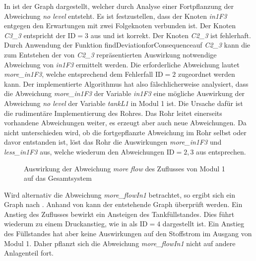 In  ist der Graph dargestellt, welcher durch Analyse einer Fortpflanzung der Abweichung \textit{no level} entsteht. Es ist festzustellen, dass der Knoten \textit{in1F3} entgegen den Erwartungen mit zwei Folgeknoten verbunden ist. Der Knoten \textit{C3\_3} entspricht der $\text{ID} = 3$ aus  und ist korrekt. Der Knoten \textit{C2\_3} ist fehlerhaft. Durch Anwendung der Funktion \glqq findDeviationforConsequence\grqq { }auf \textit{C2\_3} kann die zum Entstehen der von \textit{C2\_3} repr\"asentierten Auswirkung notwendige Abweichung von \textit{in1F3} ermittelt werden. Die erforderliche Abweichung lautet \textit{more{\_}in1F3}, welche entsprechend  dem Fehlerfall $\text{ID} = 2$ zugeordnet werden kann. Der implementierte Algorithmus hat also f\"alschlicherweise analysiert, dass die Abweichung \textit{more{\_}in1F3} der Variable \textit{in1F3} eine m\"ogliche Auswirkung der Abweichung \textit{no level} der Variable \textit{tankL1} in Modul 1 ist. Die Ursache daf\"ur ist die rudiment\"are Implementierung des Rohres. Das Rohr leitet einerseits vorhandene Abweichungen weiter, es erzeugt aber auch neue Abweichungen. Da nicht unterschieden wird, ob die fortgepflanzte Abweichung im Rohr selbst oder davor entstanden ist, l\"ost das Rohr die Auswirkungen \textit{more{\_}in1F3} und \textit{less{\_}in1F3} aus, welche wiederum den Abweichungen $\text{ID} = 2,3$ aus  entsprechen. 
  
\begin{figure}[h!tb]
\centering

\caption[Fehlerfortpflanzung im Gesamtsystem korrekt analysiert]{Auswirkung der Abweichung \textit{more flow} des Zuflusses von Modul 1 auf das Gesamtsystem}
\label{fig:graph_sysGesFehlerfortMoreFlow}
\end{figure}

Wird alternativ die Abweichung \textit{more{\_}flowIn1} betrachtet, so ergibt sich ein Graph nach . Anhand von  kann der entstehende Graph \"uberpr\"uft werden. Ein Anstieg des Zuflusses bewirkt ein Ansteigen des Tankf\"ullstandes. Dies f\"uhrt wiederum zu einem Druckanstieg, wie in  als $\text{ID} = 4$ dargestellt ist. Ein Anstieg des F\"ullstandes hat aber keine Auswirkungen auf den Stoffstrom im Ausgang von Modul 1. Daher pflanzt sich die Abweichung \textit{more{\_}flowIn1} nicht auf andere Anlagenteil fort. 

